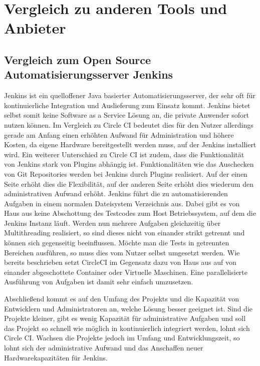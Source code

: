 \documentclass[11pt]{article}
\begin{document}
\section {Vergleich zu anderen Tools und Anbieter}
\subsection {Vergleich zum Open Source Automatisierungsserver Jenkins}
Jenkins ist ein quelloffener Java basierter Automatisierungsserver, der sehr oft für kontinuierliche Integration und Auslieferung zum Einsatz kommt.
Jenkins bietet selbst somit keine Software as a Service Lösung an, die private Anwender sofort nutzen können.
Im Vergleich zu Circle CI bedeutet dies für den Nutzer allerdings gerade am Anfang einen erhöhten Aufwand für Administration und höhere Kosten, da eigene 
Hardware bereitgestellt werden muss, auf der Jenkins installiert wird.
Ein weiterer Unterschied zu Circle CI ist zudem, dass die Funktionalität von Jenkins stark von Plugins abhängig ist.
Funktionalitäten wie das Auschecken von Git Repositories werden bei Jenkins durch Plugins realisiert.
Auf der einen Seite erhöht dies die Flexibilität, auf der anderen Seite erhöht dies wiederum den administrativen Aufwand erhöht.
Jenkins führt die zu automatisierenden Aufgaben in einem normalen Dateisystem Verzeichnis aus.
Dabei gibt es von Haus aus keine Abschottung des Testcodes zum Host Betriebssystem, auf dem die Jenkins Instanz läuft.
Werden nun mehrere Aufgaben gleichzeitig über Multithreading realisiert, so sind dieses nicht von einander strikt getrennt und können sich gegenseitig beeinflussen.
Möchte man die Tests in getrennten Bereichen ausführen, so muss dies vom Nutzer selbst umgesetzt werden.
Wie bereits beschrieben setzt CircleCI im Gegensatz dazu von Haus aus auf von einander abgeschottete Container oder Virtuelle Maschinen.
Eine parallelisierte Ausführung von Aufgaben ist damit sehr einfach umzusetzen.

Abschließend kommt es auf den Umfang des Projekts und die Kapazität von Entwicklern und Administratoren an, welche Lösung besser geeignet ist.
Sind die Projekte kleiner, gibt es wenig Kapazität für administrative Aufgaben und soll das Projekt so schnell wie möglich in kontinuierlich integriert werden, lohnt sich Circle CI.
Wachsen die Projekte jedoch im Umfang und Entwicklungszeit, so lohnt sich der administrative Aufwand und das Anschaffen neuer Hardwarekapazitäten für Jenkins.
\end{document}

